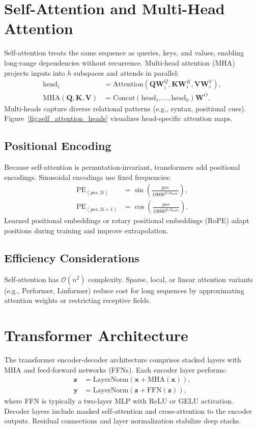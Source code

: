 ﻿\documentclass[12pt]{article}
\begin{document}
\section{Self-Attention and Multi-Head Attention}
Self-attention treats the same sequence as queries, keys, and values, enabling long-range dependencies without recurrence. Multi-head attention (MHA) projects inputs into $h$ subspaces and attends in parallel:
\begin{align}
  \mathrm{head}_i &= \mathrm{Attention}(\mathbf{Q} \mathbf{W}_i^Q, \mathbf{K} \mathbf{W}_i^K, \mathbf{V} \mathbf{W}_i^V), \\
  \mathrm{MHA}(\mathbf{Q}, \mathbf{K}, \mathbf{V}) &= \mathrm{Concat}(\mathrm{head}_1, \ldots, \mathrm{head}_h) \mathbf{W}^O.
\end{align}
Multi-heads capture diverse relational patterns (e.g., syntax, positional cues). Figure~\ref{fig:self_attention_heads} visualizes head-specific attention maps.

\subsection{Positional Encoding}
Because self-attention is permutation-invariant, transformers add positional encodings. Sinusoidal encodings use fixed frequencies:
\begin{align}
  \mathrm{PE}_{(pos, 2i)} &= \sin\left( \frac{pos}{10000^{2i/d_{\text{model}}}} \right), \\
  \mathrm{PE}_{(pos, 2i+1)} &= \cos\left( \frac{pos}{10000^{2i/d_{\text{model}}}} \right).
\end{align}
Learned positional embeddings or rotary positional embeddings (RoPE) adapt positions during training and improve extrapolation.

\subsection{Efficiency Considerations}
Self-attention has $\mathcal{O}(n^2)$ complexity. Sparse, local, or linear attention variants (e.g., Performer, Linformer) reduce cost for long sequences by approximating attention weights or restricting receptive fields.

\section{Transformer Architecture}
The transformer encoder-decoder architecture comprises stacked layers with MHA and feed-forward networks (FFNs). Each encoder layer performs:
\begin{align}
  \mathbf{z} &= \mathrm{LayerNorm}(\mathbf{x} + \mathrm{MHA}(\mathbf{x})), \\
  \mathbf{y} &= \mathrm{LayerNorm}(\mathbf{z} + \mathrm{FFN}(\mathbf{z})),
\end{align}
where FFN is typically a two-layer MLP with ReLU or GELU activation. Decoder layers include masked self-attention and cross-attention to the encoder outputs. Residual connections and layer normalization stabilize deep stacks.
\end{document}
